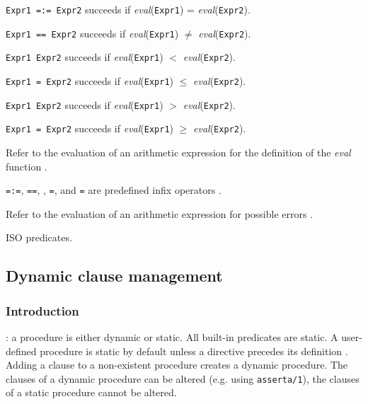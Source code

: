\Description

\texttt{Expr1 =:= Expr2} succeeds if \textit{eval}(\texttt{Expr1}) =
\textit{eval}(\texttt{Expr2}).

\texttt{Expr1 ={\bs}= Expr2} succeeds if \textit{eval}(\texttt{Expr1})
$\neq$ \textit{eval}(\texttt{Expr2}).

\texttt{Expr1 {\lt} Expr2} succeeds if \textit{eval}(\texttt{Expr1}) $<$
\textit{eval}(\texttt{Expr2}).

\texttt{Expr1 ={\lt} Expr2} succeeds if \textit{eval}(\texttt{Expr1})
$\leq$ \textit{eval}(\texttt{Expr2}).

\texttt{Expr1 {\gt} Expr2} succeeds if \textit{eval}(\texttt{Expr1}) $>$
\textit{eval}(\texttt{Expr2}).

\texttt{Expr1 {\gt}= Expr2} succeeds if \textit{eval}(\texttt{Expr1})
$\geq$ \textit{eval}(\texttt{Expr2}).

Refer to the evaluation of an arithmetic expression for the definition of
the \textit{eval} function .

\texttt{=:=}, \texttt{={\bs}=}, \texttt{{\lt}}, \texttt{={\lt}},
\texttt{{\gt}} and \texttt{{\gt}=} are predefined infix operators
.

\Errors

Refer to the evaluation of an arithmetic expression for possible errors
.

\Portability

ISO predicates.

\subsection{Dynamic clause management}

\subsubsection{Introduction}
\label{Introduction:(Dynamic-clause-management)}
: a procedure is either dynamic or
static. All built-in predicates are static. A user-defined procedure is
static by default unless a  directive precedes its
definition . Adding a clause to a non-existent procedure
creates a dynamic procedure. The clauses of a dynamic procedure can be
altered (e.g. using \texttt{asserta/1}), the clauses of a static procedure
cannot be altered. 

